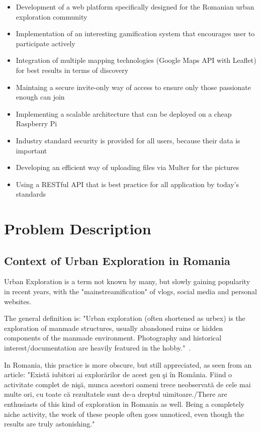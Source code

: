 \documentclass[12pt,a4paper]{report}
\begin{document}
\begin{itemize}
    \item Development of a web platform specifically designed for the Romanian urban exploration community
    \item Implementation of an interesting gamification system that encourages user to participate actively
    \item Integration of multiple mapping technologies (Google Maps API with Leaflet) for best results in terms of discovery
    \item Maintaing a secure invite-only way of access to ensure only those passionate enough can join
    \item Implementing a scalable architecture that can be deployed on a cheap Raspberry Pi
    \item Industry standard security is provided for all users, because their data is important
    \item Developing an efficient way of uploading files via Multer for the pictures
    \item Using a RESTful API that is best practice for all application by today's standards
\end{itemize}

\newpage

\chapter{Problem Description}
\section{Context of Urban Exploration in Romania}
Urban Exploration is a term not known by many, but slowly gaining popularity in recent years, with the "mainstreamification" of vlogs, social media and personal websites.

The general definition is: "Urban exploration (often shortened as urbex) is the exploration of manmade structures, usually abandoned ruins or hidden components of the manmade environment. Photography and historical interest/documentation are heavily featured in the hobby."~\cite{wikipediaUrbexDefinition}.

In Romania, this practice is more obscure, but still appreciated, as seen from an article: "Există iubitori ai explorărilor de acest gen şi în România. Fiind o activitate complet de nişă, munca acestori oameni trece neobservată de cele mai multe ori, cu toate că rezultatele sunt de-a dreptul uimitoare./There are enthusiasts of this kind of exploration in Romania as well. Being a completely niche activity, the work of these people often goes unnoticed, even though the results are truly astonishing."~\cite{articleUrbexRomania}
\end{document}

